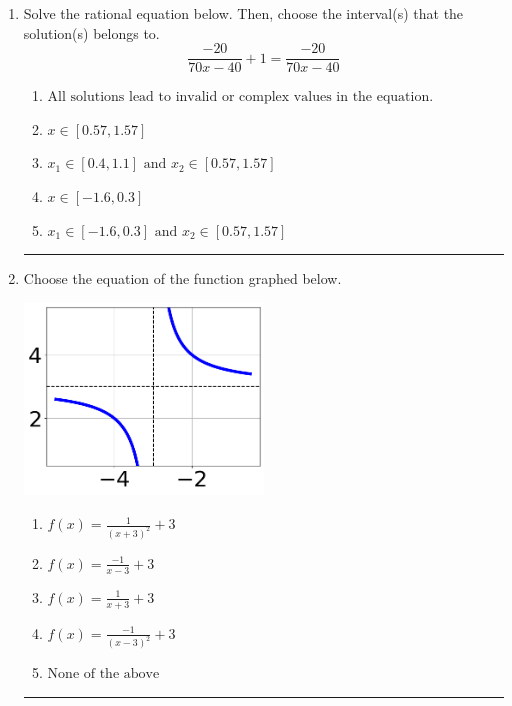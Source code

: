 \documentclass[14pt]{extbook}
\newcommand{\litem}[1]{\item#1\hspace*{-1cm}\rule{\textwidth}{0.4pt}}
\begin{document}
\begin{enumerate}
\litem{
Solve the rational equation below. Then, choose the interval(s) that the solution(s) belongs to.\[ \frac{-20}{70x -40} + 1 = \frac{-20}{70x -40} \]\begin{enumerate}[label=\Alph*.]
\item \( \text{All solutions lead to invalid or complex values in the equation.} \)
\item \( x \in [0.57,1.57] \)
\item \( x_1 \in [0.4, 1.1] \text{ and } x_2 \in [0.57,1.57] \)
\item \( x \in [-1.6,0.3] \)
\item \( x_1 \in [-1.6, 0.3] \text{ and } x_2 \in [0.57,1.57] \)

\end{enumerate} }
\litem{
Choose the equation of the function graphed below.
\begin{center}
    \includegraphics[width=0.5\textwidth]{../Figures/rationalGraphToEquationB.png}
\end{center}
\begin{enumerate}[label=\Alph*.]
\item \( f(x) = \frac{1}{(x + 3)^2} + 3 \)
\item \( f(x) = \frac{-1}{x - 3} + 3 \)
\item \( f(x) = \frac{1}{x + 3} + 3 \)
\item \( f(x) = \frac{-1}{(x - 3)^2} + 3 \)
\item \( \text{None of the above} \)


\end{enumerate}}
\end{enumerate}
\end{document}
